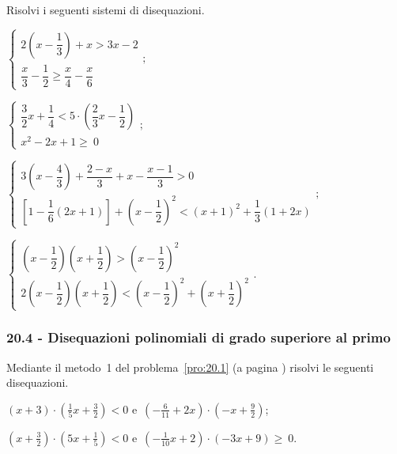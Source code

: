 \begin{esercizio}[\Ast]
 \label{ese:20.41}
 Risolvi i seguenti sistemi di disequazioni.

 \begin{enumeratea}
 \item {\longarray $\left\{\begin{array}{l}
	2\left(x-\dfrac{1}{3}\right)+x>3x-2\\
	\dfrac{x}{3}-\dfrac{1}{2}\ge \dfrac{x}{4}-\dfrac{x}{6}
   \end{array}\right.;$}
\item $\left\{\begin{array}{l}
    \dfrac{3}{2}x+\dfrac{1}{4}<5\cdot\left(\dfrac{2}{3}x-\dfrac{1}{2}\right)\\
    x^2-2x+1\ge~0
   \end{array}\right.;$
\item {\longarray $\left\{\begin{array}{l}
	3\left(x-\dfrac{4}{3}\right)+\dfrac{2-x}{3}+x-\dfrac{x-1}{3}>0\\
	\left[1-\dfrac{1}{6}(2x+1)\right]+\left(x-\dfrac{1}{2}\right)^{2}<(x+1)^{2}+\dfrac{1}{3}(1+2x)
   \end{array}\right.;$}
\item {\longarray $\left\{\begin{array}{l}
	\left(x-\dfrac{1}{2}\right)\left(x+\dfrac{1}{2}\right)>\left(x-\dfrac{1}{2}\right)^{2}\\
	2\left(x-\dfrac{1}{2}\right)\left(x+\dfrac{1}{2}\right)<\left(x-\dfrac{1}{2}\right)^{2}+\left(x+\dfrac{1}{2}\right)^{2}
   \end{array}\right..$}
 \end{enumeratea}
\end{esercizio}

\subsubsection*{20.4 - Disequazioni polinomiali di grado superiore al primo}
\begin{esercizio}
 \label{ese:20.42}
 Mediante il metodo~1 del problema~\ref{pro:20.1} (a pagina \pageref{pro:20.1}) risolvi le seguenti disequazioni.

\begin{enumeratea}
\item $(x+3)\cdot \left(\frac{1}{5}x+\frac{3}{2}\right)<0$ e~$\left(-{\frac{6}{11}}+2x\right)\cdot\left(-x+\frac{9}{2}\right)$;
\item $\left(x+\frac{3}{2}\right)\cdot \left(5x+\frac{1}{5}\right)<0$ e~$\left(-{\frac{1}{10}}x+2\right)\cdot \left(-3x+9\right)\ge~0$.
\end{enumeratea}

\end{esercizio}

